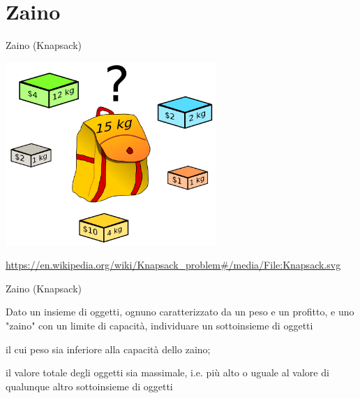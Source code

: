 \section{Zaino}

\begin{frame}{Zaino (Knapsack)}

\begin{center}
\includegraphics[width=0.6\textwidth]{knapsack.png}
\end{center}

\footnotesize
\url{https://en.wikipedia.org/wiki/Knapsack_problem\#/media/File:Knapsack.svg}

\end{frame}

\begin{frame}{Zaino (Knapsack)}

Dato un insieme di oggetti, ognuno caratterizzato da un \alert{peso} e un \alert{profitto},
e uno "zaino" con un limite di capacità, individuare un sottoinsieme di oggetti 
\BIL
\item il cui peso sia inferiore alla capacità dello zaino;\
\item il valore totale degli oggetti sia massimale, i.e.
più alto o uguale al valore di qualunque altro sottoinsieme di oggetti 
\EIL
\end{frame}

